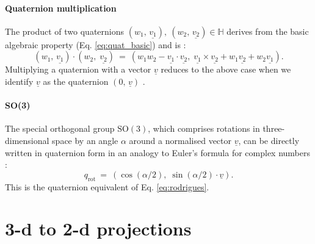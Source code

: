 \paragraph{Quaternion multiplication}
The product of two quaternions $\left( w_1,\,\underline{v_1} \right),\ \left( w_2,\,\underline{v_2} \right) \in \mathbb{H}$ 
derives from the basic algebraic property (Eq. \ref{eq:quat_basic}) and is \cite[pp. 106-110]{Kuipers2002}:
\begin{equation}
	\left( w_1, \,\underline{v_1} \right) \cdot \left( w_2, \;\underline{v_2} \right) \ =\ 
	\left( w_1 w_2 - \underline{v_1} \cdot \underline{v_2}, \;\underline{v_1} \times \underline{v_2} + w_1 \underline{v_2} + w_2 \underline{v_1}\right).
\end{equation}
Multiplying a quaternion with a vector $\underline{v}$ reduces to the above case when we identify $\underline{v}$
as the quaternion $\left( 0,\,\underline{v} \right)$ \cite{TODO}.

\paragraph{SO(3)}
The special orthogonal group $\mathrm{SO\left(3\right)}$, which comprises rotations in three-dimensional space by an angle
$\alpha$ around a normalised vector $\underline{v}$, can be directly written in quaternion form in an analogy to 
Euler's formula for complex numbers \cite{wiki_quatrot}:
\begin{equation}
	\boxed{
	q_{\mathrm{rot}} \ =\ \left(\cos\left(\alpha/2 \right),\; \sin\left(\alpha/2 \right) \cdot \underline{v} \right).
	}
\end{equation}
This is the quaternion equivalent of Eq. \ref{eq:rodrigues}.


\section{3-d to 2-d projections}


